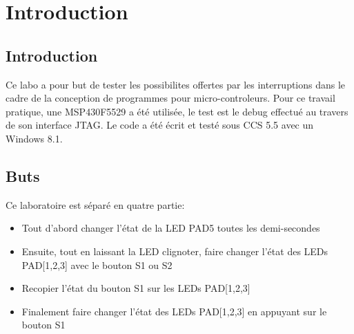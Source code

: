 \section*{Introduction}

\subsection*{Introduction}
Ce labo a pour but de tester les possibilites offertes par les interruptions dans le cadre de la conception de programmes pour micro-controleurs.
Pour ce travail pratique, une MSP430F5529 a été utilisée, le test est le debug effectué au travers de son interface JTAG.
Le code a été écrit et testé sous CCS 5.5 avec un Windows 8.1.

\subsection{Buts}
Ce laboratoire est séparé en quatre partie:
\begin{itemize}
\item Tout d'abord changer l'état de la LED PAD5 toutes les demi-secondes
\item Ensuite, tout en laissant la LED clignoter, faire changer l'état des LEDs PAD[1,2,3] avec le bouton S1 ou S2
\item Recopier l'état du bouton S1 sur les LEDs PAD[1,2,3]
\item Finalement faire changer l'état des LEDs PAD[1,2,3] en appuyant sur le bouton S1
\end{itemize}
